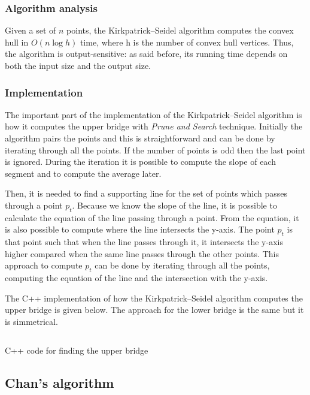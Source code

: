 \documentclass{article}
\begin{document}
\subsubsection*{Algorithm analysis}
Given a set of $n$ points, the Kirkpatrick–Seidel algorithm computes the convex hull in $O(n\log{h})$ time, where h is the number of convex hull vertices. Thus, the algorithm is output-sensitive: as said before, its running time depends on both the input size and the output size. 

\subsubsection*{Implementation}

The important part of the implementation of the Kirkpatrick–Seidel algorithm is how it computes the upper bridge with \textit{Prune and Search} technique. Initially the algorithm pairs the points and this is straightforward and can be done by iterating through all the points. If the number of points is odd then the last point is ignored.  During the iteration it is possible to compute the slope of each segment and to compute the average later. 

Then, it is needed to find a supporting line for the set of points which passes through a point $p_t$. Because we know the slope of the line, it is possible to calculate the equation of the line passing through a point. From the equation, it is also possible to compute where the line intersects the y-axis. The point $p_t$ is that point such that when the line passes through it, it intersects the y-axis higher compared when the same line passes through the other points. This approach to compute $p_t$ can be done by iterating through all the points, computing the equation of the line and the intersection with the y-axis. 

The C++ implementation of how the Kirkpatrick–Seidel algorithm computes the upper bridge is given below. The approach for the lower bridge is the same but it is simmetrical.

\begin{listing}[H]
    \inputminted[linenos]{cpp}{code/kirk.cpp}
    \caption{C++ code for finding the upper bridge}
\end{listing}

\newpage
\subsection{Chan's algorithm}
\end{document}
